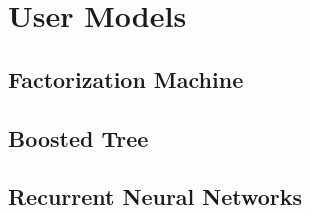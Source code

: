
\chapter{User Models}

\section{Factorization Machine}

\section{Boosted Tree}

\section{Recurrent Neural Networks}















